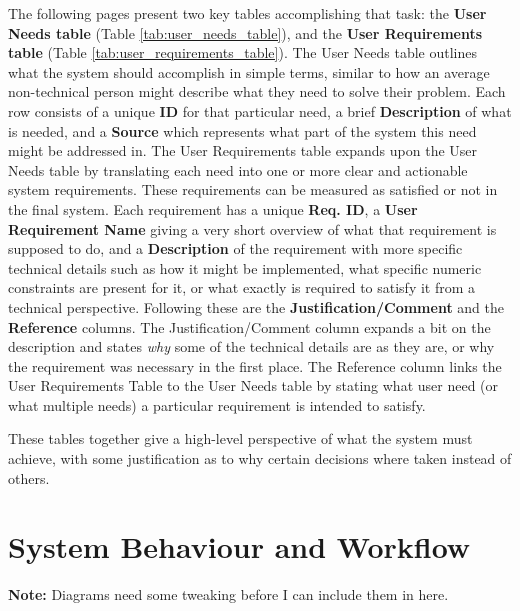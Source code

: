 The following pages present two key tables accomplishing that task: the \textbf{User Needs table} (Table \ref{tab:user_needs_table}), and the \textbf{User Requirements table} (Table \ref{tab:user_requirements_table}). The User Needs table outlines what the system should accomplish in simple terms, similar to how an average non-technical person might describe what they need to solve their problem. Each row consists of a unique \textbf{ID} for that particular need, a brief \textbf{Description} of what is needed, and a \textbf{Source} which represents what part of the system this need might be addressed in. The User Requirements table expands upon the User Needs table by translating each need into one or more clear and actionable system requirements. These requirements can be measured as satisfied or not in the final system. Each requirement has a unique \textbf{Req. ID}, a \textbf{User Requirement Name} giving a very short overview of what that requirement is supposed to do, and a \textbf{Description} of the requirement with more specific technical details such as how it might be implemented, what specific numeric constraints are present for it, or what exactly is required to satisfy it from a technical perspective. Following these are the \textbf{Justification/Comment} and the \textbf{Reference} columns. The Justification/Comment column expands a bit on the description and states \textit{why} some of the technical details are as they are, or why the requirement was necessary in the first place. The Reference column links the User Requirements Table to the User Needs table by stating what user need (or what multiple needs) a particular requirement is intended to satisfy.

These tables together give a high-level perspective of what the system must achieve, with some justification as to why certain decisions where taken instead of others.


\clearpage

\clearpage

\section{System Behaviour and Workflow} %
\textbf{Note:} Diagrams need some tweaking before I can include them in here.

